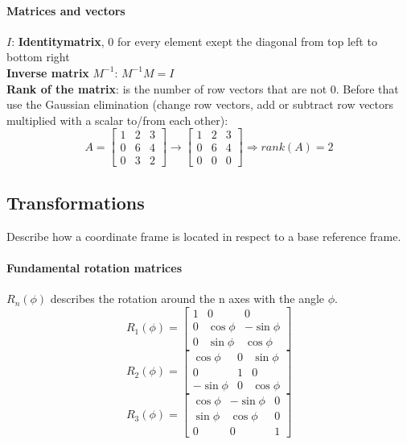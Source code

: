 \documentclass[12pt]{article}
\begin{document}
	\paragraph{Matrices and vectors}
	$I$: \textbf{Identitymatrix}, 0 for every element exept the diagonal from top left to bottom right\\
	\textbf{Inverse matrix} $M^{-1}$: $M^{-1} M = I$\\
	\textbf{Rank of the matrix}: is the number of row vectors that are not 0. Before that use the Gaussian elimination (change row vectors, add or subtract row vectors multiplied with a scalar to/from each other):
	\begin{equation}
	A = 
	\begin{bmatrix}
	1 & 2 & 3\\
	0 & 6 & 4\\
	0 & 3 & 2
	\end{bmatrix}
	\rightarrow
	\begin{bmatrix}
	1 & 2 & 3\\
	0 & 6 & 4\\
	0 & 0 & 0
	\end{bmatrix}
	\Rightarrow
	rank(A) = 2
	\end{equation}
	
	
	\subsection{Transformations}
	Describe how a coordinate frame is located in respect to a base reference frame.
	\paragraph{Fundamental rotation matrices} $R_{n}(\phi)$ describes the rotation around the n axes with the angle $\phi$.\\
	\begin{equation}
	R_{1}(\phi) = 
	\begin{bmatrix}
	1 & 0 & 0\\
	0 & \cos \phi & -\sin \phi\\
	0 & \sin \phi & \cos \phi
	\end{bmatrix}
	\end{equation}
	\begin{equation}
	R_{2}(\phi) = 
	\begin{bmatrix}
	\cos \phi & 0 & \sin \phi\\
	0 & 1 & 0\\
	-\sin \phi & 0 & \cos \phi
	\end{bmatrix}
	\end{equation}
	\begin{equation}
	R_{3}(\phi) = 
	\begin{bmatrix}
	\cos \phi & -\sin \phi & 0\\
	\sin \phi & \cos \phi & 0\\
	0 & 0 & 1
	\end{bmatrix}
	\end{equation}
	
\end{document}
